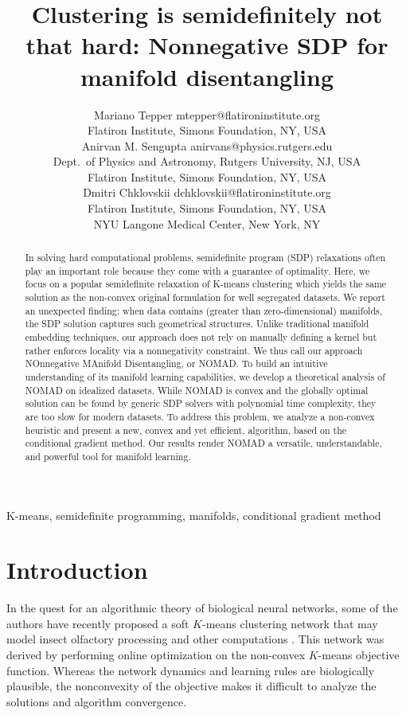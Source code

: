 \documentclass[twoside,11pt]{article}
\title{Clustering is semidefinitely not that hard: Nonnegative SDP for manifold disentangling}
\author{\name Mariano Tepper \email mtepper@flatironinstitute.org\\ 
\addr Flatiron Institute, Simons Foundation, NY, USA\\ 
\AND 
\name Anirvan M. Sengupta \email anirvans@physics.rutgers.edu\\
\addr Dept.~of Physics and Astronomy, Rutgers University, NJ, USA\\ 
\addr Flatiron Institute, Simons Foundation, NY, USA\\
\AND 
\name Dmitri Chklovskii \email dchklovskii@flatironinstitute.org\\ 
\addr Flatiron Institute, Simons Foundation, NY, USA\\
\addr NYU Langone Medical Center, New York, NY}
\begin{document}
 

\maketitle

\begin{abstract}%
In solving hard computational problems, semidefinite program (SDP) relaxations often play an important role because they come with a guarantee of optimality. Here, we focus on a popular semidefinite relaxation of K-means clustering which yields the same solution as the non-convex original formulation for well segregated datasets. We report an unexpected finding: when data contains (greater than zero-dimensional) manifolds, the SDP solution captures such geometrical structures.
Unlike traditional manifold embedding techniques, our approach does not rely on manually defining a kernel but rather enforces locality via a nonnegativity constraint. We thus call our approach NOnnegative MAnifold Disentangling, or NOMAD. To build an intuitive understanding of its manifold learning capabilities, we develop a theoretical analysis of NOMAD on idealized datasets. While NOMAD is convex and the globally optimal solution can be found by generic SDP solvers with polynomial time complexity, they are too slow for modern datasets. To address this problem, we analyze a non-convex heuristic and present a new, convex and yet efficient, algorithm, based on the conditional gradient method. Our results render NOMAD a versatile, understandable, and powerful tool for manifold learning.
\end{abstract}

\begin{keywords}
  K-means, semidefinite programming, manifolds, conditional gradient method
\end{keywords}

\section{Introduction}

In the quest for an algorithmic theory of biological neural networks, some of the authors have recently proposed a soft $K$-means clustering network that may model insect olfactory processing and other computations \citep{Pehlevan2017olfaction}. This network was derived by performing online optimization on the non-convex $K$-means objective function. Whereas the network dynamics and learning rules are biologically plausible, the nonconvexity of the objective makes it difficult to analyze the solutions and algorithm convergence. 
\end{document}
